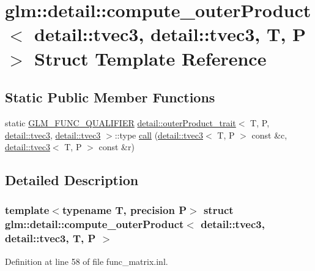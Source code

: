 \hypertarget{structglm_1_1detail_1_1compute__outer_product_3_01detail_1_1tvec3_00_01detail_1_1tvec3_00_01_t_00_01_p_01_4}{}\section{glm\+:\+:detail\+:\+:compute\+\_\+outer\+Product$<$ detail\+:\+:tvec3, detail\+:\+:tvec3, T, P $>$ Struct Template Reference}
\label{structglm_1_1detail_1_1compute__outer_product_3_01detail_1_1tvec3_00_01detail_1_1tvec3_00_01_t_00_01_p_01_4}
\subsection*{Static Public Member Functions}
\begin{DoxyCompactItemize}
\item 
static \hyperlink{setup_8hpp_a33fdea6f91c5f834105f7415e2a64407}{G\+L\+M\+\_\+\+F\+U\+N\+C\+\_\+\+Q\+U\+A\+L\+I\+F\+I\+ER} \hyperlink{structglm_1_1detail_1_1outer_product__trait}{detail\+::outer\+Product\+\_\+trait}$<$ T, P, \hyperlink{structglm_1_1detail_1_1tvec3}{detail\+::tvec3}, \hyperlink{structglm_1_1detail_1_1tvec3}{detail\+::tvec3} $>$\+::type \hyperlink{structglm_1_1detail_1_1compute__outer_product_3_01detail_1_1tvec3_00_01detail_1_1tvec3_00_01_t_00_01_p_01_4_ab97eae3a1827791b1e9e3324ea454b2d}{call} (\hyperlink{structglm_1_1detail_1_1tvec3}{detail\+::tvec3}$<$ T, P $>$ const \&c, \hyperlink{structglm_1_1detail_1_1tvec3}{detail\+::tvec3}$<$ T, P $>$ const \&r)
\end{DoxyCompactItemize}


\subsection{Detailed Description}
\subsubsection*{template$<$typename T, precision P$>$\newline
struct glm\+::detail\+::compute\+\_\+outer\+Product$<$ detail\+::tvec3, detail\+::tvec3, T, P $>$}



Definition at line 58 of file func\+\_\+matrix.\+inl.




